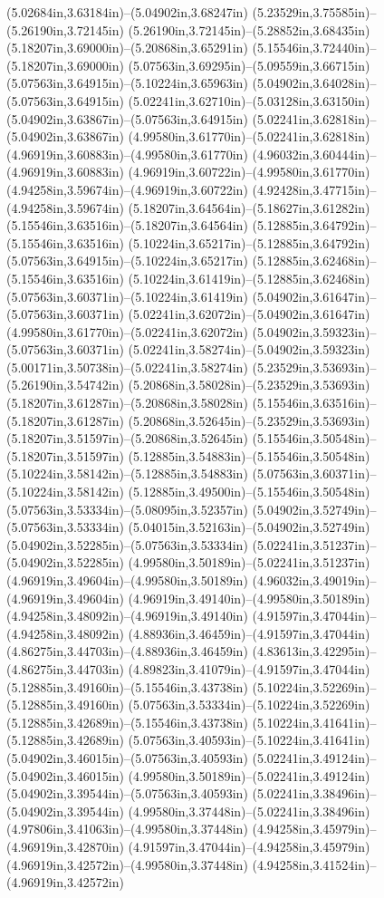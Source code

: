 (5.02684in,3.63184in)--(5.04902in,3.68247in) (5.23529in,3.75585in)--(5.26190in,3.72145in) (5.26190in,3.72145in)--(5.28852in,3.68435in) (5.18207in,3.69000in)--(5.20868in,3.65291in) (5.15546in,3.72440in)--(5.18207in,3.69000in) (5.07563in,3.69295in)--(5.09559in,3.66715in) (5.07563in,3.64915in)--(5.10224in,3.65963in) (5.04902in,3.64028in)--(5.07563in,3.64915in) (5.02241in,3.62710in)--(5.03128in,3.63150in) (5.04902in,3.63867in)--(5.07563in,3.64915in) (5.02241in,3.62818in)--(5.04902in,3.63867in) (4.99580in,3.61770in)--(5.02241in,3.62818in) (4.96919in,3.60883in)--(4.99580in,3.61770in) (4.96032in,3.60444in)--(4.96919in,3.60883in) (4.96919in,3.60722in)--(4.99580in,3.61770in) (4.94258in,3.59674in)--(4.96919in,3.60722in) (4.92428in,3.47715in)--(4.94258in,3.59674in) (5.18207in,3.64564in)--(5.18627in,3.61282in) (5.15546in,3.63516in)--(5.18207in,3.64564in) (5.12885in,3.64792in)--(5.15546in,3.63516in) (5.10224in,3.65217in)--(5.12885in,3.64792in) (5.07563in,3.64915in)--(5.10224in,3.65217in) (5.12885in,3.62468in)--(5.15546in,3.63516in) (5.10224in,3.61419in)--(5.12885in,3.62468in) (5.07563in,3.60371in)--(5.10224in,3.61419in) (5.04902in,3.61647in)--(5.07563in,3.60371in) (5.02241in,3.62072in)--(5.04902in,3.61647in) (4.99580in,3.61770in)--(5.02241in,3.62072in) (5.04902in,3.59323in)--(5.07563in,3.60371in) (5.02241in,3.58274in)--(5.04902in,3.59323in) (5.00171in,3.50738in)--(5.02241in,3.58274in) (5.23529in,3.53693in)--(5.26190in,3.54742in) (5.20868in,3.58028in)--(5.23529in,3.53693in) (5.18207in,3.61287in)--(5.20868in,3.58028in) (5.15546in,3.63516in)--(5.18207in,3.61287in) (5.20868in,3.52645in)--(5.23529in,3.53693in) (5.18207in,3.51597in)--(5.20868in,3.52645in) (5.15546in,3.50548in)--(5.18207in,3.51597in) (5.12885in,3.54883in)--(5.15546in,3.50548in) (5.10224in,3.58142in)--(5.12885in,3.54883in) (5.07563in,3.60371in)--(5.10224in,3.58142in) (5.12885in,3.49500in)--(5.15546in,3.50548in) (5.07563in,3.53334in)--(5.08095in,3.52357in) (5.04902in,3.52749in)--(5.07563in,3.53334in) (5.04015in,3.52163in)--(5.04902in,3.52749in) (5.04902in,3.52285in)--(5.07563in,3.53334in) (5.02241in,3.51237in)--(5.04902in,3.52285in) (4.99580in,3.50189in)--(5.02241in,3.51237in) (4.96919in,3.49604in)--(4.99580in,3.50189in) (4.96032in,3.49019in)--(4.96919in,3.49604in) (4.96919in,3.49140in)--(4.99580in,3.50189in) (4.94258in,3.48092in)--(4.96919in,3.49140in) (4.91597in,3.47044in)--(4.94258in,3.48092in) (4.88936in,3.46459in)--(4.91597in,3.47044in) (4.86275in,3.44703in)--(4.88936in,3.46459in) (4.83613in,3.42295in)--(4.86275in,3.44703in) (4.89823in,3.41079in)--(4.91597in,3.47044in) (5.12885in,3.49160in)--(5.15546in,3.43738in) (5.10224in,3.52269in)--(5.12885in,3.49160in) (5.07563in,3.53334in)--(5.10224in,3.52269in) (5.12885in,3.42689in)--(5.15546in,3.43738in) (5.10224in,3.41641in)--(5.12885in,3.42689in) (5.07563in,3.40593in)--(5.10224in,3.41641in) (5.04902in,3.46015in)--(5.07563in,3.40593in) (5.02241in,3.49124in)--(5.04902in,3.46015in) (4.99580in,3.50189in)--(5.02241in,3.49124in) (5.04902in,3.39544in)--(5.07563in,3.40593in) (5.02241in,3.38496in)--(5.04902in,3.39544in) (4.99580in,3.37448in)--(5.02241in,3.38496in) (4.97806in,3.41063in)--(4.99580in,3.37448in) (4.94258in,3.45979in)--(4.96919in,3.42870in) (4.91597in,3.47044in)--(4.94258in,3.45979in) (4.96919in,3.42572in)--(4.99580in,3.37448in) (4.94258in,3.41524in)--(4.96919in,3.42572in) 
